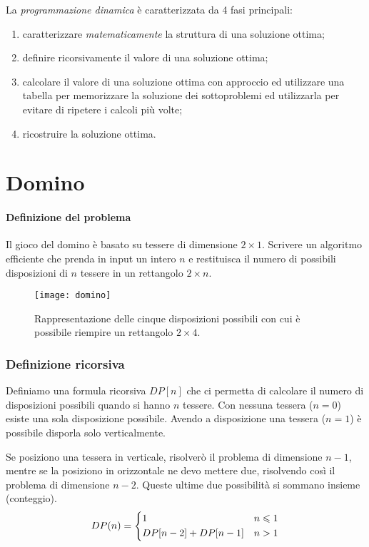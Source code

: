 La \emph{programmazione dinamica} è caratterizzata da 4 fasi principali:
\begin{enumerate}
    \item caratterizzare \emph{matematicamente} la struttura di una soluzione ottima;
    \item definire ricorsivamente il valore di una soluzione ottima;
    \item calcolare il valore di una soluzione ottima con approccio  ed utilizzare una tabella per memorizzare la soluzione dei sottoproblemi  ed utilizzarla per evitare di ripetere i calcoli più volte;
    \item ricostruire la soluzione ottima.
\end{enumerate}

\clearpage
\section{Domino}

\paragraph{Definizione del problema}
Il gioco del domino è basato su tessere di dimensione \(2 \times 1\).
Scrivere un algoritmo efficiente che prenda in input un intero \(n\) e restituisca il numero di possibili disposizioni di \(n\) tessere in un rettangolo \(2 \times n\).

\begin{figure}[H]\centering
    \texttt{[image: domino]}
    \caption[]{Rappresentazione delle cinque disposizioni possibili con cui è possibile riempire un rettangolo \(2 \times 4\).}
\end{figure}

\subsubsection{Definizione ricorsiva}

Definiamo una formula ricorsiva \(DP[n]\) che ci permetta di calcolare il numero di disposizioni possibili quando si hanno \(n\) tessere.
Con nessuna tessera (\(n=0\)) esiste una sola disposizione possibile.
Avendo a disposizione una tessera (\(n=1\)) è possibile disporla solo verticalmente.

Se posiziono una tessera in verticale, risolverò il problema di dimensione \(n-1\), mentre se la posiziono in orizzontale ne devo mettere due, risolvendo così il problema di dimensione \(n-2\).
Queste ultime due possibilità si sommano insieme (conteggio).
\[
    DP(n) =
    \begin{dcases}
    1                 & n \leqslant 1 \\
    DP[n-2] + DP[n-1] & n > 1 \\
    \end{dcases}
\]

